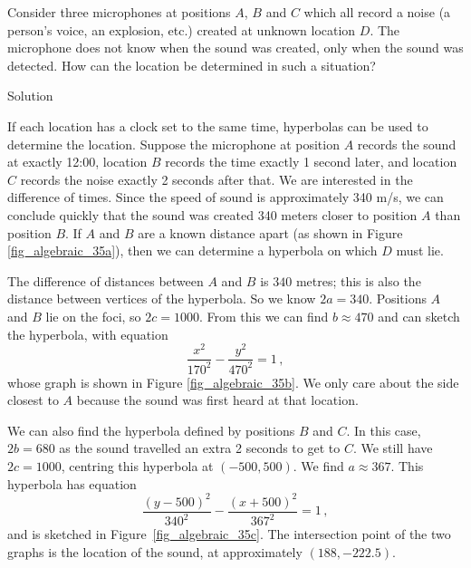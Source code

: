 \begin{example}
Consider three microphones at positions $A$, $B$ and $C$ which all record a noise (a person's voice, an explosion, etc.) created at unknown location $D$. The microphone does not know when the sound was created, only when the sound was detected. How can the location be determined in such a situation?

Solution 

If each location has a clock set to the same time, hyperbolas can be used to determine the location. Suppose the microphone at position $A$ records the sound at exactly 12:00, location $B$ records the time exactly 1 second later, and location $C$ records the noise exactly 2 seconds after that. We are interested in the difference of times. Since the speed of sound is approximately 340 m/s, we can conclude quickly that the sound was created 340 meters closer to position $A$ than position $B$. If $A$ and $B$ are a known distance apart (as shown in Figure \ref{fig_algebraic_35a}), then we can determine a hyperbola on which $D$ must lie. 

The difference of distances between $A$ and $B$ is $340$ metres; this is also the distance between vertices of the hyperbola. So we know $2a= 340$. Positions $A$ and $B$ lie on the foci, so $2c=1000$. From this we can find $b\approx 470$ and can sketch the hyperbola, with equation 
$$
\dfrac{x^2}{170^2}-\dfrac{y^2}{470^2}=1\,,
$$
whose graph is shown in Figure \ref{fig_algebraic_35b}. We only care about the side closest to $A$ because the sound was first heard at that location.

We can also find the hyperbola defined by positions $B$ and $C$. In this case, $2b = 680$ as the sound travelled an extra 2 seconds to get to $C$. We still have $2c=1000$, centring this hyperbola at $(-500,500)$. We find $a\approx 367$. This hyperbola has equation 
$$
\dfrac{(y-500)^2}{340^2}-\dfrac{(x+500)^2}{367^2}=1\,,
$$
and is sketched in Figure~\ref{fig_algebraic_35c}. The intersection point of the two graphs is the location of the sound, at approximately $(188,-222.5)$.



\end{example}
